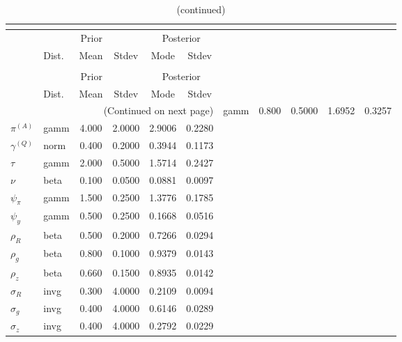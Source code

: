  
\begin{center}
\begin{longtable}{llcccc} 
\caption{Results from posterior maximization (parameters)}\\
 \label{Table:Posterior:1}\\
\toprule 
  & \multicolumn{3}{c}{Prior}  &  \multicolumn{2}{c}{Posterior} \\
  \cmidrule(r{.75em}){2-4} \cmidrule(r{.75em}){5-6}
  & Dist. & Mean  & Stdev & Mode & Stdev \\ 
\midrule \endfirsthead 
\caption{(continued)}\\
 \bottomrule 
  & \multicolumn{3}{c}{Prior}  &  \multicolumn{2}{c}{Posterior} \\
  \cmidrule(r{.75em}){2-4} \cmidrule(r{.75em}){5-6}
  & Dist. & Mean  & Stdev & Mode & Stdev \\ 
\midrule \endhead 
\bottomrule \multicolumn{6}{r}{(Continued on next page)}\endfoot 
\bottomrule\endlastfoot 
${r_{A}}$ & gamm &   0.800 & 0.5000 &   1.6952 &  0.3257 \\ 
${\pi^{(A)}}$ & gamm &   4.000 & 2.0000 &   2.9006 &  0.2280 \\ 
${\gamma^{(Q)}}$ & norm &   0.400 & 0.2000 &   0.3944 &  0.1173 \\ 
${\tau}$ & gamm &   2.000 & 0.5000 &   1.5714 &  0.2427 \\ 
${\nu}$ & beta &   0.100 & 0.0500 &   0.0881 &  0.0097 \\ 
${\psi_\pi}$ & gamm &   1.500 & 0.2500 &   1.3776 &  0.1785 \\ 
${\psi_y}$ & gamm &   0.500 & 0.2500 &   0.1668 &  0.0516 \\ 
${\rho_R}$ & beta &   0.500 & 0.2000 &   0.7266 &  0.0294 \\ 
${\rho_{g}}$ & beta &   0.800 & 0.1000 &   0.9379 &  0.0143 \\ 
${\rho_z}$ & beta &   0.660 & 0.1500 &   0.8935 &  0.0142 \\ 
${\sigma_R}$ & invg &   0.300 & 4.0000 &   0.2109 &  0.0094 \\ 
${\sigma_{g}}$ & invg &   0.400 & 4.0000 &   0.6146 &  0.0289 \\ 
${\sigma_z}$ & invg &   0.400 & 4.0000 &   0.2792 &  0.0229 \\ 
\end{longtable}
 \end{center}
